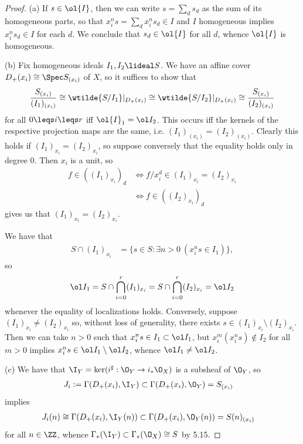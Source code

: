 \documentclass[12pt]{amsart}
\begin{document}
\begin{proof}
  (a) If $s\in \ol{I}$, then we can write $s= \sum_ds_d$ as the sum of its homogeneous parts, so that $x_i^ns=\sum_dx_i^ns_d\in I$ and $I$ homogeneous implies $x_i^ns_d\in I$ for each $d$.
  We conclude that $s_d\in \ol{I}$ for all $d$, whence $\ol{I}$ is homogeneous.

  (b) Fix homogeneous ideals $I_1,I_2\lideal S$. 
  We have an affine cover $D_+(x_i)\cong \Spec S_{(x_i)}$ of $X$, so it suffices to show that 
  \[
    \frac{S_{(x_i)}}{(I_1)_{(x_i)}}
    \cong \wtilde{S/I_1}|_{D_+(x_i)}
    \cong \wtilde{S/I_2}|_{D_+(x_i)} 
    \cong \frac{S_{(x_i)}}{(I_2)_{(x_i)}}
  \] 
  for all $0\leqs i\leqs r$ iff $\ol{I}_1=\ol I_2$.
  This occurs iff the kernels of the respective projection maps are the same, i.e. $(I_1)_{(x_i)}= (I_2)_{(x_i)}$.
  Clearly this holds if $(I_1)_{x_i}=(I_2)_{x_i}$, so suppose conversely that the equality holds only in degree 0.
  Then $x_i$ is a unit, so
  \begin{align*}
    f\in ((I_1)_{x_i})_d 
    &\iff f/x_i^d\in (I_1)_{x_i}=(I_2)_{x_i} \\
    &\iff f\in((I_2)_{x_i})_d
  \end{align*}
  gives us that $(I_1)_{x_i}=(I_2)_{x_i}$.

  We have that
  \begin{align*}
    S\cap (I_1)_{x_i} &= \{s\in S:\exists n>0~ (x_i^ns\in I_1)\},
  \end{align*}
  so 
  \[
    \ol I_1 = S\cap \bigcap_{i=0}^r(I_1)_{x_i} =S\cap\bigcap_{i=0}^r(I_2)_{x_i}=\ol I_2
  \] 
  whenever the equality of localizations holds.
  Conversely, suppose $(I_1)_{x_i}\neq (I_2)_{x_i}$ so, without loss of generality, there exists $s\in (I_1)_{x_i}\setminus (I_2)_{x_i}$.
  Then we can take $n>0$ such that $x_i^ns\in I_1\subset\ol I_1$, but $x_i^m(x_i^ns)\notin I_2$ for all $m>0$ implies $x_i^ns\in \ol I_1\setminus \ol I_2$, whence $\ol I_1\neq \ol I_2$.

  (c) We have that $\I_Y=\ker (i^\sharp:\O_Y\to i_*\O_X)$ is a subsheaf of $\O_Y$, so 
  \begin{align*}
    J_i:=\Gamma(D_+(x_i),\I_Y)&\subset \Gamma(D_+(x_i),\O_Y)=S_{(x_i)}
  \end{align*}
  implies
  \begin{align*}
    J_i(n)\cong \Gamma(D_+(x_i),\I_Y(n))&\subset \Gamma(D_+(x_i),\O_Y(n))=S(n)_{(x_i)}
  \end{align*}
  for all $n\in \ZZ$,
  whence $\Gamma_*(\I_Y)\subset \Gamma_*(\O_X)\cong S$ by 5.15.


\end{proof}
\end{document}
